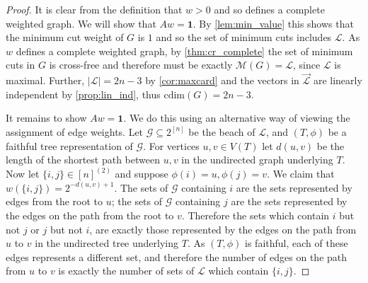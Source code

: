 \documentclass[10pt,a4paper]{article}
\newcommand{\Lcal}{\mathcal{L}}
\newcommand{\M}{\mathcal{M}}
\newcommand{\Gcal}{\mathcal{G}}
\newcommand{\cd}{\mathrm{cdim}}
\newcommand{\1}{\mathbf{1}}
\theoremstyle{definition}
\begin{document}
\begin{proof}
It is clear from the definition that $w >0$ and so defines a complete weighted graph.
We will show that $Aw = \1$.  By \cref{lem:min_value} this shows that
the minimum cut weight of $G$ is $1$ and so the set of minimum cuts includes $\Lcal$.  As $w$ defines a complete weighted graph, by \cref{thm:cr_complete}
the set of minimum cuts in $G$ is cross-free and therefore must be exactly $\M(G) = \Lcal$, since $\Lcal$ is maximal.  Further, {$|\Lcal| = 2n-3$ by \cref{cor:maxcard} and}
the vectors in $\vec{\Lcal}$ are linearly independent by \cref{prop:lin_ind}, thus $\cd(G) = 2n-3$.

It remains to show $Aw = \1$.
We do this using an alternative way of viewing the assignment of edge weights.
Let $\Gcal \subseteq 2^{[n]}$ be the beach of $\Lcal$, and $(T,\phi)$ be a faithful
tree representation of $\Gcal$.  For vertices $u,v \in V(T)$ let $d(u,v)$ be the length of the shortest path between $u,v$ in the undirected graph underlying $T$.
Now let $\{i,j\} \in [n]^{(2)}$ and suppose $\phi(i) = u, \phi(j) = v$.  We claim that $w(\{i,j\}) = 2^{-d(u,v)+1}$.
The sets of $\Gcal$ containing $i$ are the sets represented by edges from the root to $u$;  the sets of $\Gcal$ containing
$j$ are the sets represented by the edges on the path from the root to $v$.  Therefore the sets which contain $i$ but not $j$ or $j$ but
not $i$, are exactly those represented by the edges on the path from $u$ to $v$ in the undirected tree underlying $T$.  As $(T,\phi)$ is faithful,
each of these edges represents a different set, and therefore the number of edges on the path from $u$ to $v$ is exactly the number of
sets of $\Lcal$ which contain $\{i,j\}$.


\end{proof}
\end{document}

